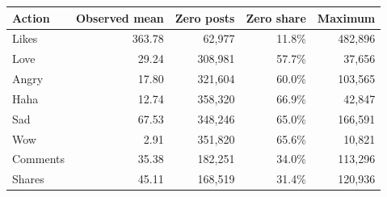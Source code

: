 \begin{tabular}{lrrrr}
\toprule
Action & Observed mean & Zero posts & Zero share & Maximum \\
\midrule
Likes & 363.78 & 62,977 & 11.8\% & 482,896 \\
Love & 29.24 & 308,981 & 57.7\% & 37,656 \\
Angry & 17.80 & 321,604 & 60.0\% & 103,565 \\
Haha & 12.74 & 358,320 & 66.9\% & 42,847 \\
Sad & 67.53 & 348,246 & 65.0\% & 166,591 \\
Wow & 2.91 & 351,820 & 65.6\% & 10,821 \\
Comments & 35.38 & 182,251 & 34.0\% & 113,296 \\
Shares & 45.11 & 168,519 & 31.4\% & 120,936 \\
\bottomrule
\end{tabular}
